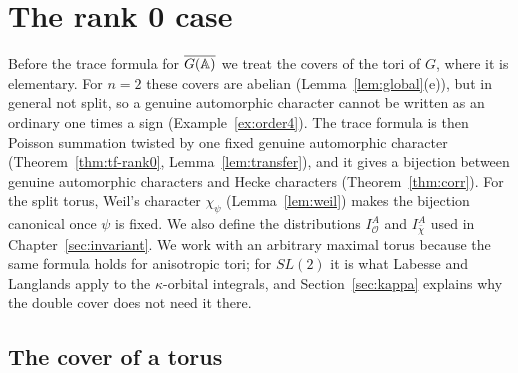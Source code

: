 %

\chapter{The rank 0 case}\label{sec:rank0}

Before the trace formula for $\overline{G(\mathbb{A})}$ we treat the covers of
the tori of $G$, where it is elementary. For $n=2$ these covers are
abelian (Lemma~\ref{lem:global}(e)), but in general not split, so a
genuine automorphic character cannot be written as an ordinary one
times a sign (Example~\ref{ex:order4}). The trace formula is then
Poisson summation twisted by one fixed genuine automorphic character
(Theorem~\ref{thm:tf-rank0}, Lemma~\ref{lem:transfer}), and it gives a
bijection between genuine automorphic characters and Hecke characters
(Theorem~\ref{thm:corr}). For the split torus, Weil's character
$\chi_\psi$ (Lemma~\ref{lem:weil}) makes the bijection canonical once
$\psi$ is fixed. We also define the distributions $I^A_{\mathcal O}$ and
$I^A_{\bar\chi}$ used in Chapter~\ref{sec:invariant}. We work with an arbitrary maximal
torus because the same formula holds for anisotropic tori; for $SL(2)$
it is what Labesse and Langlands apply to the $\kappa$-orbital integrals,
and Section~\ref{sec:kappa} explains why the double cover does not need
it there.

\section{The cover of a torus}\label{sec:torus-cover}

